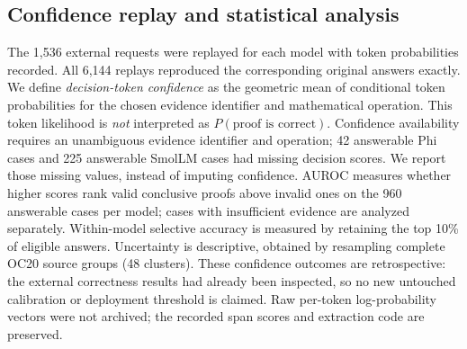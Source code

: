 \subsection{Confidence replay and statistical analysis}
\label{sec:confidence_methods}

The 1,536 external requests were replayed for each model with token probabilities recorded. All 6,144 replays reproduced the corresponding original answers exactly. We define \emph{decision-token confidence} as the geometric mean of conditional token probabilities for the chosen evidence identifier and mathematical operation. This token likelihood is \emph{not} interpreted as $P(\text{proof is correct})$. Confidence availability requires an unambiguous evidence identifier and operation; 42 answerable Phi cases and 225 answerable SmolLM cases had missing decision scores. We report those missing values, instead of imputing confidence. AUROC measures whether higher scores rank valid conclusive proofs above invalid ones on the 960 answerable cases per model; cases with insufficient evidence are analyzed separately. Within-model selective accuracy is measured by retaining the top 10\% of eligible answers. Uncertainty is descriptive, obtained by resampling complete OC20 source groups (48 clusters). These confidence outcomes are retrospective: the external correctness results had already been inspected, so no new untouched calibration or deployment threshold is claimed. Raw per-token log-probability vectors were not archived; the recorded span scores and extraction code are preserved.
